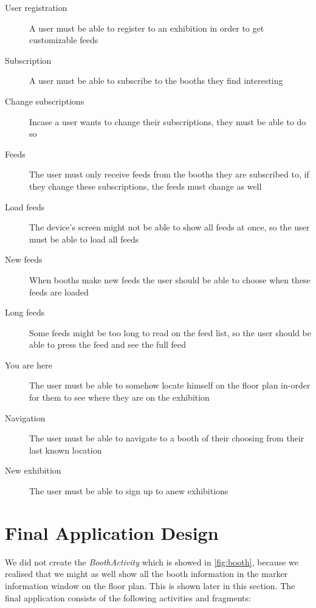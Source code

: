 \begin{description}
\item[User registration] A user must be able to register to an exhibition in order to get customizable feeds
\item[Subscription] A user must be able to subscribe to the booths they find interesting
\item[Change subscriptions] Incase a user wants to change their subscriptions, they must be able to do so
\item[Feeds] The user must only receive feeds from the booths they are subscribed to, if they change these subscriptions, the feeds must change as well
\item[Load feeds] The device's screen might not be able to show all feeds at once, so the user must be able to load all feeds
\item[New feeds] When booths make new feeds the user should be able to choose when these feeds are loaded
\item[Long feeds] Some feeds might be too long to read on the feed list, so the user should be able to press the feed  and see the full feed
\item[You are here] The user must be able to somehow locate himself on the floor plan in-order for them to see where they are on the exhibition
\item[Navigation] The user must be able to navigate to a booth of their choosing from their last known location
\item[New exhibition] The user must be able to sign up to anew exhibitions 
\end{description}

\section{Final Application Design}\label{sec:finaldesign}

We did not create the \textit{BoothActivity} which is showed in \autoref{fig:booth}, because we realised that we might as well show all the booth information in the marker information window on the floor plan. This is shown later in this section. The final application consists of the following activities and fragments:

